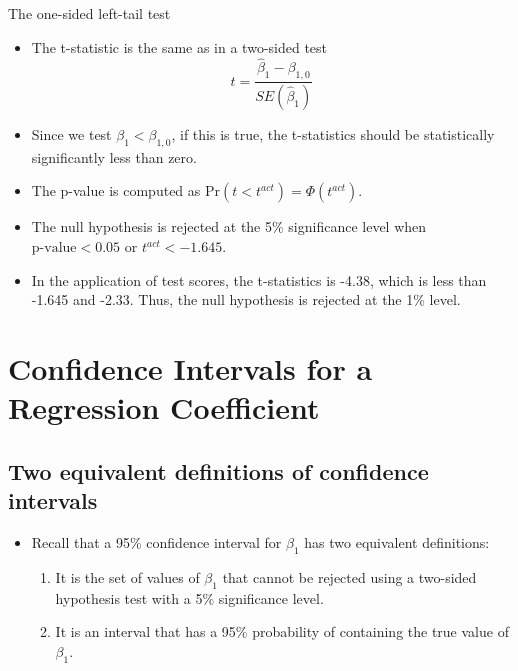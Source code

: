 \documentclass[presentation]{beamer}
\begin{document}
\begin{frame}[label={sec:org4c22398}]{The one-sided left-tail test}
\begin{itemize}
\item The t-statistic is the same as in a two-sided test
\[ t = \frac{\hat{\beta}_1 - \beta_{1,0}}{SE(\hat{\beta}_1)} \]

\item Since we test \(\beta_1 < \beta_{1,0}\), if this is true, the
t-statistics should be statistically significantly less than zero.

\item The p-value is computed as \(\mathrm{Pr}(t < t^{act}) = \Phi(t^{act})\).

\item The null hypothesis is rejected at the 5\% significance level when
\(\text{p-value} < 0.05\) or \(t^{act} < -1.645\).

\item In the application of test scores, the t-statistics is -4.38, which
is less than -1.645 and -2.33. Thus, the null hypothesis is rejected
at the 1\% level.
\end{itemize}
\end{frame}




\section*{Confidence Intervals for a Regression Coefficient}
\label{sec:org1ac622c}

\subsection*{Two equivalent definitions of confidence intervals}
\label{sec:org62167dd}

\begin{itemize}
\item Recall that a 95\% \alert{confidence interval} for \(\beta_1\) has two equivalent
definitions:
\begin{enumerate}
\item It is the set of values of \(\beta_1\) that cannot be rejected
using a two-sided hypothesis test with a 5\% significance level.
\item It is an interval that has a 95\% probability of containing the true
value of \(\beta_1\).
\end{enumerate}
\end{itemize}
\end{document}
